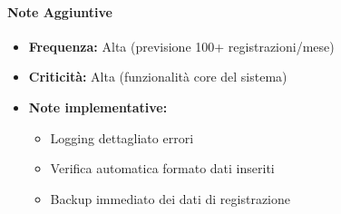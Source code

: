 \paragraph{Note Aggiuntive}
\begin{itemize}
\item \textbf{Frequenza:} Alta (previsione 100+ registrazioni/mese)
\item \textbf{Criticità:} Alta (funzionalità core del sistema)
\item \textbf{Note implementative:}
    \begin{itemize}
    \item Logging dettagliato errori  
    \item Verifica automatica formato dati inseriti
    \item Backup immediato dei dati di registrazione
    \end{itemize}
\end{itemize}